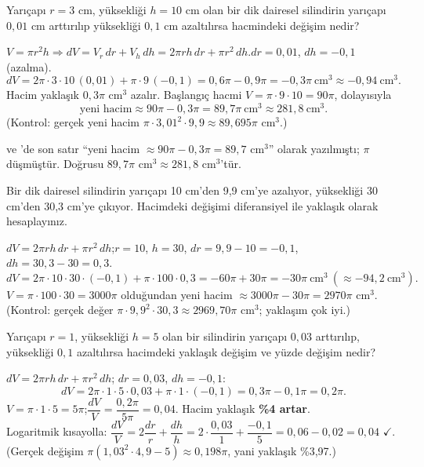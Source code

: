 \begin{soru}
Yarıçapı $r=3$ cm, yüksekliği $h=10$ cm olan bir dik dairesel silindirin yarıçapı $0{,}01$ cm arttırılıp yüksekliği
$0{,}1$ cm azaltılırsa hacmindeki değişim nedir?
\end{soru}
\begin{cevap}
$V=\pi r^2h\Rightarrow dV=V_r\,dr+V_h\,dh=2\pi rh\,dr+\pi r^2\,dh$.\quad $dr=0{,}01$, $dh=-0{,}1$ (azalma).
\[
dV=2\pi\cdot3\cdot10\,(0{,}01)+\pi\cdot9\,(-0{,}1)=0{,}6\pi-0{,}9\pi=-0{,}3\pi\ \text{cm}^3\approx-0{,}94\ \text{cm}^3 .
\]
Hacim yaklaşık $0{,}3\pi$ cm$^3$ azalır. Başlangıç hacmi $V=\pi\cdot9\cdot10=90\pi$, dolayısıyla
\[ \text{yeni hacim}\approx90\pi-0{,}3\pi=89{,}7\pi\ \text{cm}^3\approx281{,}8\ \text{cm}^3 . \]
(Kontrol: gerçek yeni hacim $\pi\cdot3{,}01^2\cdot9{,}9\approx89{,}695\pi$ cm$^3$.)
\end{cevap}

\begin{dikkat}
 ve 'de son satır ``yeni hacim $\approx90\pi-0{,}3\pi=89{,}7$ cm$^3$''
olarak yazılmıştı; $\pi$ düşmüştür. Doğrusu $89{,}7\pi$ cm$^3\approx281{,}8$ cm$^3$'tür.
\end{dikkat}

\begin{soru}
Bir dik dairesel silindirin yarıçapı 10 cm'den 9,9 cm'ye azalıyor, yüksekliği 30 cm'den 30,3 cm'ye çıkıyor. Hacimdeki
değişimi diferansiyel ile yaklaşık olarak hesaplayınız.
\end{soru}
\begin{cevap}
$dV=2\pi rh\,dr+\pi r^2\,dh$;\quad $r=10$, $h=30$, $dr=9{,}9-10=-0{,}1$, $dh=30{,}3-30=0{,}3$.
\[
dV=2\pi\cdot10\cdot30\cdot(-0{,}1)+\pi\cdot100\cdot0{,}3=-60\pi+30\pi=-30\pi\ \text{cm}^3\ (\approx-94{,}2\ \text{cm}^3).
\]
$V=\pi\cdot100\cdot30=3000\pi$ olduğundan yeni hacim $\approx3000\pi-30\pi=2970\pi$ cm$^3$.
(Kontrol: gerçek değer $\pi\cdot9{,}9^2\cdot30{,}3\approx2969{,}70\pi$ cm$^3$; yaklaşım çok iyi.)
\end{cevap}

\begin{soru}
Yarıçapı $r=1$, yüksekliği $h=5$ olan bir silindirin yarıçapı $0{,}03$ arttırılıp, yüksekliği $0{,}1$ azaltılırsa
hacimdeki yaklaşık değişim ve yüzde değişim nedir?
\end{soru}
\begin{cevap}
$dV=2\pi rh\,dr+\pi r^2\,dh$; $dr=0{,}03$, $dh=-0{,}1$:
\[ dV=2\pi\cdot1\cdot5\cdot0{,}03+\pi\cdot1\cdot(-0{,}1)=0{,}3\pi-0{,}1\pi=0{,}2\pi . \]
$V=\pi\cdot1\cdot5=5\pi$;\quad $\dfrac{dV}{V}=\dfrac{0{,}2\pi}{5\pi}=0{,}04$. Hacim yaklaşık \textbf{\%4 artar}.\\
Logaritmik kısayolla: $\dfrac{dV}{V}=2\dfrac{dr}{r}+\dfrac{dh}{h}=2\cdot\dfrac{0{,}03}{1}+\dfrac{-0{,}1}{5}=0{,}06-0{,}02=0{,}04$ $\checkmark$.
(Gerçek değişim $\pi(1{,}03^2\cdot4{,}9-5)\approx0{,}198\pi$, yani yaklaşık \%3,97.)
\end{cevap}

